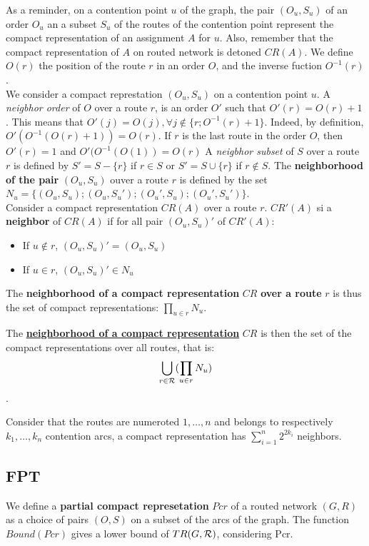 \documentclass[english]{article}
\begin{document}
As a reminder, on a contention point $u$ of the graph, the pair $(O_u,S_u)$ of an order $O_u$ an a subset $S_u$ of the routes of the contention point represent the compact representation of an assignment $A$ for $u$.
 Also, remember that the compact representation of $A$ on routed network is detoned $CR(A)$.
We define $O(r)$ the position of the route $r$ in an order $O$, and the inverse fuction $O^{-1}(r)$.\\
We consider a compact represtation $(O_u,S_u)$ on a contention point $u$.
A \textit{neigbhor order} of  $O$ over a route $r$, is an order $O'$ such that $O'(r) = O(r)+1$ . This means that $O'(j) = O(j),\forall j \notin \{r;O^{-1}(r)+1\}$. Indeed, by definition, $O'(O^{-1}(O(r)+1)) = O(r)$. If $r$ is the last route in the order $O$, then $O'(r) = 1$ and $O'(O^{-1}(O(1))=O(r)$
A \textit{neigbhor subset} of $S$ over a route $r$ is defined by $S' = S - \{r\}$ if $r\in S$ or $S'= S \cup \{r\}$ if $ r \notin S$.
The \textbf{neighborhood of the pair} $(O_u,S_u)$ ouver a route $r$ is defined by the set $N_u = \{(O_u,S_u);(O_u,S_u');(O_u',S_u);(O_u',S_u')\}$.\\

Consider a compact representation $CR(A)$ over a route $r$.
$CR'(A)$ si a \textbf{neighbor} of $CR(A)$ if for all pair $(O_u,S_u)'$ of $CR'(A)$:
\begin{itemize}
 \item If $u \notin r$, $(O_u,S_u)' = (O_u,S_u)$
 \item If $u \in r$, $(O_u,S_u)' \in N_u $
\end{itemize}

The \textbf{neighborhood of a compact representation} $CR$ \textbf{over a route} $r$  is thus the set of compact representations: $\prod_{u\in r} N_u$.

The \textbf{\underline{neighborhood of a compact representation}} $CR$ is then the set of the compact representations over all routes, that is:
$$ \bigcup_{r\in{\cal R}} (\prod_{u\in r} N_u ) $$.

 Consider that the routes are numeroted $1,\ldots,n$ and belongs to respectively $k_1,\ldots,k_n$ contention arcs, a compact representation has $\sum_{i=1}^n 2^{2k_i} $ neighbors.


 
\subsection{FPT}
We define a \textbf{partial compact represetation} $Pcr$ of a routed network $(G,R)$ as a choice of pairs $(O,S)$ on a subset of the arcs of the graph.
The function $Bound(Pcr)$ gives a lower bound of $TR(G,{\cal R})$, considering Pcr.
\end{document}
